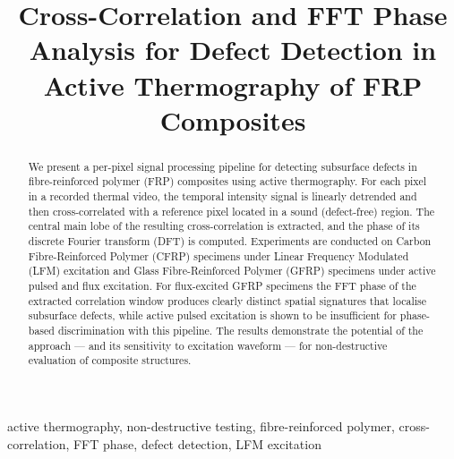 \documentclass[conference]{IEEEtran}
\begin{document}
  \title{{\fontsize{20}{20}\selectfont Cross-Correlation and FFT Phase Analysis for Defect Detection in Active
  Thermography of FRP Composites}}
  \author{
    \and
    }

  \maketitle

  \begin{abstract}
  We present a per-pixel signal processing pipeline for detecting subsurface
  defects in fibre-reinforced polymer (FRP) composites using active thermography.
  For each pixel in a recorded thermal video, the temporal intensity signal is
  linearly detrended and then cross-correlated with a reference pixel located in
  a sound (defect-free) region. The central main lobe of the resulting
  cross-correlation is extracted, and the phase of its discrete Fourier transform
  (DFT) is computed. Experiments are conducted on Carbon Fibre-Reinforced Polymer
  (CFRP) specimens under Linear Frequency Modulated (LFM) excitation and Glass
  Fibre-Reinforced Polymer (GFRP) specimens under active pulsed and flux
  excitation. For flux-excited GFRP specimens the FFT phase of the extracted
  correlation window produces clearly distinct spatial signatures that localise
  subsurface defects, while active pulsed excitation is shown to be insufficient
  for phase-based discrimination with this pipeline. The results demonstrate
  the potential of the approach --- and its sensitivity to excitation waveform
  --- for non-destructive evaluation of composite structures.
  \end{abstract}

  \begin{IEEEkeywords}
  active thermography, non-destructive testing, fibre-reinforced polymer,
  cross-correlation, FFT phase, defect detection, LFM excitation
  \end{IEEEkeywords}
\end{document}
